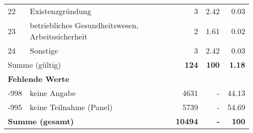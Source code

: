 \begin{longtable}{lXrrr}
        22 & \multicolumn{1}{X}{Existenzgründung} & %
          \num{3} &
          \num[round-mode=places,round-precision=2]{2,42} &
          \num[round-mode=places,round-precision=2]{0,03} \\

        23 & \multicolumn{1}{X}{betriebliches Gesundheitswesen, Arbeitssicherheit} & %
          \num{2} &
          \num[round-mode=places,round-precision=2]{1,61} &
          \num[round-mode=places,round-precision=2]{0,02} \\

        24 & \multicolumn{1}{X}{Sonstige} & %
          \num{3} &
          \num[round-mode=places,round-precision=2]{2,42} &
          \num[round-mode=places,round-precision=2]{0,03} \\

     \midrule
     \multicolumn{2}{l}{Summe (gültig)} &
       \textbf{\num{124}} &
     \textbf{100} &
       \textbf{\num[round-mode=places,round-precision=2]{1,18}} \\
     \multicolumn{5}{l}{\textbf{Fehlende Werte}}\\
       -998 &
       keine Angabe &
         \num{4631} &
        - &
         \num[round-mode=places,round-precision=2]{44,13} \\
       -995 &
       keine Teilnahme (Panel) &
         \num{5739} &
        - &
         \num[round-mode=places,round-precision=2]{54,69} \\
     \midrule
     \multicolumn{2}{l}{\textbf{Summe (gesamt)}} &
          \textbf{\num{10494}} &
        \textbf{-} &
        \textbf{100} \\
     \bottomrule
     \end{longtable}
     
